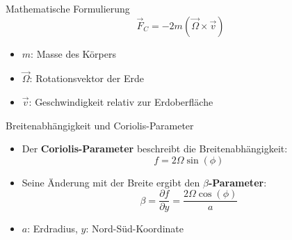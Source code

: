 \begin{frame}{Mathematische Formulierung}
	\begin{equation*}
		\vec{F}_C = -2m (\vec{\Omega} \times \vec{v})
	\end{equation*}
	\vspace{0.5cm}
	\begin{itemize}
		\item \( m \): Masse des Körpers
		\item \( \vec{\Omega} \): Rotationsvektor der Erde
		\item \( \vec{v} \): Geschwindigkeit relativ zur Erdoberfläche
	\end{itemize}
\end{frame}

\begin{frame}{Breitenabhängigkeit und Coriolis-Parameter}
	\begin{itemize}
		\item Der \textbf{Coriolis-Parameter} beschreibt die Breitenabhängigkeit:
		      \[
			      f = 2 \Omega \sin(\phi)
		      \]
		\item Seine Änderung mit der Breite ergibt den \textbf{\(\beta\)-Parameter}:
		      \[
			      \beta = \frac{\partial f}{\partial y} = \frac{2 \Omega \cos(\phi)}{a}
		      \]
		\item \(a\): Erdradius, \quad \(y\): Nord-Süd-Koordinate
	\end{itemize}
\end{frame}

